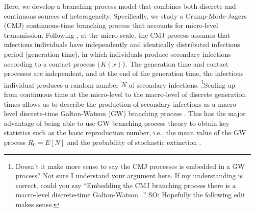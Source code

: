 \documentclass{imammb}
\numberwithin{equation}{section}
\begin{document}
Here, we develop a branching process model that combines both discrete and continuous sources of heterogeneity. Specifically, we study a Crump-Mode-Jagers (CMJ) continuous-time branching process that accounts for micro-level transmission. Following \citet{Yan2008-jc}, at the micro-scale, the CMJ process assumes that infectious individuals have independently and identically distributed infectious period (generation time), in which individuals produce secondary infections according to a contact process $\{K(x)\}$. The generation time and contact processes are independent, and at the end of the generation time, the infectious individual produces a random number $N$ of secondary infections. \footnote{Doesn't it make more sense to say the CMJ processes is embedded in a GW process? Not sure I understand your argument here. If my understanding is correct, could you say ``Embedding the CMJ branching process there is a macro-level discrete-time Galton-Watson...'' SO: Hopefully the following edit makes sense.}Scaling up from continuous time at the micro-level to the macro-level of discrete generation times allows us to describe the production of secondary infections as a macro-level discrete-time Galton-Watson (GW) branching process  \citep{Mode2000-hp, Yan2008-jc}. This has the major advantage of being able to use GW branching process theory to obtain key statistics such as the basic reproduction number, i.e., the mean value of the GW process $R_0=E[N]$ and the probability of stochastic extinction \citep{Mode2000-hp, Yan2008-jc}.


 
\end{document}
